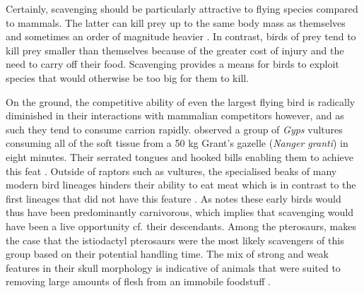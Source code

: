 \documentclass[a4paper,12pt]{article}
\begin{document}
Certainly, scavenging should be particularly attractive to flying species compared to mammals. %
The latter can kill prey up to the same body mass as themselves and sometimes an order of magnitude heavier \citep[e.g. socially hunting lions; ][]{owen2008predator}.
In contrast, birds of prey tend to kill prey smaller than themselves \citep{slagsvold2007prey} because of the greater cost of injury and the need to carry off their food.
Scavenging provides a means for birds to exploit species that would otherwise be too big for them to kill.

On the ground, the competitive ability of even the largest flying bird is radically diminished in their interactions with mammalian competitors however, and as such they tend to consume carrion rapidly. %
\cite{houston1974role} observed a group of \textit{Gyps} vultures consuming all of the soft tissue from a 50 kg Grant’s gazelle (\textit{Nanger granti}) in eight minutes. 
Their serrated tongues and hooked bills enabling them to achieve this feat \citep{houston1975digestive}. 
Outside of raptors such as vultures, the specialised beaks of many modern bird lineages hinders their ability to eat meat which is in contrast to the first lineages that did not have this feature \citep{martyniuk2012field}. 
As \cite{martyniuk2012field} notes these early birds would thus have been predominantly carnivorous, which implies that scavenging would have been a live opportunity cf. their descendants. 
Among the pterosaurs, \cite{witton2013pterosaurs} makes the case that the istiodactyl pterosaurs were the most likely scavengers of this group based on their potential handling time. 
The mix of strong and weak features in their skull morphology is indicative of animals that were suited to removing large amounts of flesh from an immobile foodstuff \citep{witton2013pterosaurs}. 
\end{document}
